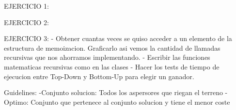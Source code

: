 EJERCICIO 1:

EJERCICIO 2:

EJERCICIO 3:
- Obtener cuantas veces se quiso acceder a un elemento de la estructura de memoizacion. Graficarlo asi vemos la cantidad de llamadas recursivas que nos ahorramos implementando.
- Escribir las funciones matematicas recursivas como en las clases
- Hacer los tests de tiempo de ejecucion entre Top-Down y Bottom-Up para elegir un ganador. 

Guidelines: 
-Conjunto solucion: Todos los aspersores que riegan el terreno
-Optimo: Conjunto que pertenece al conjunto solucion y tiene el menor coste
                       

    

